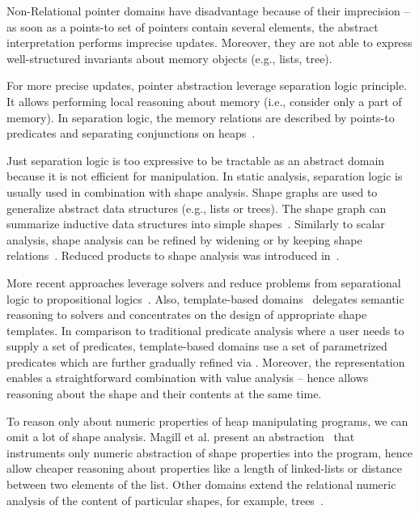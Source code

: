 Non-Relational pointer domains have disadvantage because of their imprecision -- as soon as a points-to set of pointers contain several elements, the abstract interpretation performs imprecise updates. Moreover, they are not able to express well-structured invariants about memory objects (e.g., lists, tree).

For more precise updates, pointer abstraction leverage separation logic principle. It allows performing local reasoning about memory (i.e., consider only a part of memory). In separation logic, the memory relations are described by points-to predicates and separating conjunctions on heaps~\cite{Reynolds2002}.

Just separation logic is too expressive to be tractable as an abstract domain because it is not efficient for manipulation. In static analysis, separation logic is usually used in combination with shape analysis. Shape graphs are used to generalize abstract data structures (e.g., lists or trees). The shape graph can summarize inductive data structures into simple shapes~\cite{Distefano2006}. Similarly to scalar analysis, shape analysis can be refined by widening or by keeping shape relations~\cite{Chang2008}.
Reduced products to shape analysis was introduced in~\cite{Toubhans2013}.

More recent approaches leverage \smt solvers and reduce problems from
separational logic to propositional logics~\cite{Piskac2013, Itzhaky2014,
Itzhaky2014b}.  Also, template-based domains~\cite{Malik2018} delegates
semantic reasoning to \smt solvers and concentrates on the design of
appropriate shape templates.  In comparison to traditional predicate analysis
where a user needs to supply a set of predicates, template-based domains use a
set of parametrized predicates which are further gradually refined via \smt.
Moreover, the \smt representation enables a straightforward combination with
value analysis -- hence allows reasoning about the shape and their contents at
the same time.

To reason only about numeric properties of heap manipulating programs, we can omit a lot of shape analysis. Magill et al. present an abstraction~\cite{Magill2010} that instruments only numeric abstraction of shape properties into the program, hence allow cheaper reasoning about properties like a length of linked-lists or distance between two elements of the list. Other domains extend the relational numeric analysis of the content of particular shapes, for example, trees~\cite{Journault2019}.

